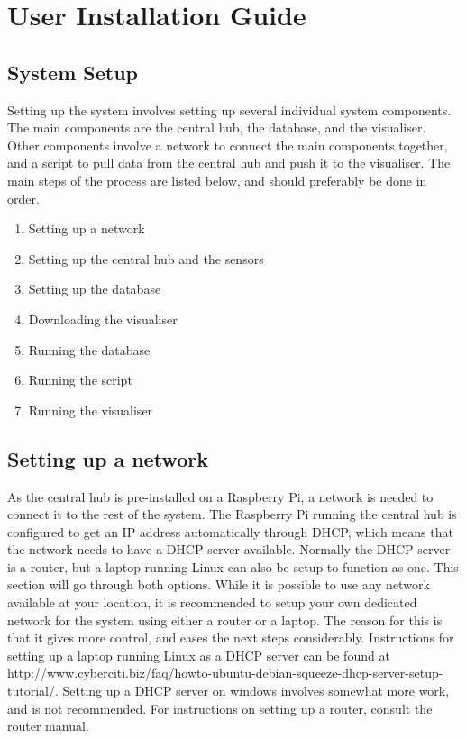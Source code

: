 \documentclass[../document.tex]{subfiles}
\begin{document}
\section{User Installation Guide}

\subsection{System Setup}
Setting up the system involves setting up several individual system components. The main components are the central hub, the database, and the visualiser. Other components involve a network to connect the main components together, and a script to pull data from the central hub and push it to the visualiser. The main steps of the process are listed below, and should preferably be done in order.
\begin{enumerate}
\item Setting up a network

\item Setting up the central hub and the sensors

\item Setting up the database

\item Downloading the visualiser

\item Running the database
\item Running the script
\item Running the visualiser
\end{enumerate}



\subsection{Setting up a network}
As the central hub is pre-installed on a \gls{Raspberry Pi}, a network is needed to connect it to the rest of the system. The \gls{Raspberry Pi} running the central hub is configured to get an IP address automatically through \gls{DHCP}, which means that the network needs to have a \gls{DHCP} server available. Normally the \gls{DHCP} server is a router, but a laptop running Linux can also be setup to function as one. This section will go through both options. While it is possible to use any network available at your location, it is recommended to setup your own dedicated network for the system using either a router or a laptop. The reason for this is that it gives more control, and eases the next steps considerably. Instructions for setting up a laptop running Linux as a \gls{DHCP} server can be found at \url{http://www.cyberciti.biz/faq/howto-ubuntu-debian-squeeze-dhcp-server-setup-tutorial/}. Setting up a \gls{DHCP} server on windows involves somewhat more work, and is not recommended. For instructions on setting up a router, consult the router manual.
\end{document}

